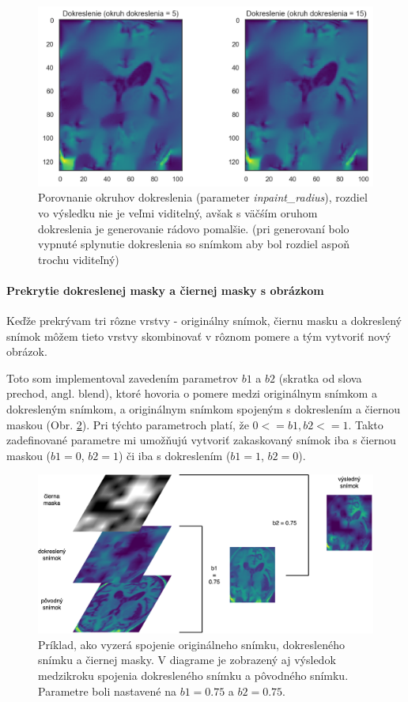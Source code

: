 \begin{figure}[h!]
    \centering
    \includegraphics[width=13cm]{assets/images/inpaint_radius.png}
    \caption{Porovnanie okruhov dokreslenia (parameter \textit{inpaint\_radius}), rozdiel vo výsledku nie je veľmi viditelný, avšak s väčśím oruhom dokreslenia je generovanie rádovo pomalšie. (pri generovaní bolo vypnuté splynutie dokreslenia so snímkom aby bol rozdiel aspoň trochu viditeľný)}
    \label{fig:inpaint_radius}
\end{figure}

\paragraph{Prekrytie dokreslenej masky a čiernej masky s obrázkom}

Keďže prekrývam tri rôzne vrstvy - originálny snímok, čiernu masku a dokreslený snímok môžem tieto vrstvy skombinovať v rôznom pomere a tým vytvoriť nový obrázok.

Toto som implementoval zavedením parametrov $b1$ a $b2$ (skratka od slova prechod, angl. blend), ktoré hovoria o pomere medzi originálnym snímkom a dokresleným snímkom, a originálnym snímkom spojeným s dokreslením a čiernou maskou (Obr. \ref{fig:risei_layers}). Pri týchto parametroch platí, že $0 <= b1, b2 <= 1$. Takto zadefinované parametre mi umožňujú vytvoriť zakaskovaný snímok iba s čiernou maskou ($b1 = 0$, $b2 = 1$) či iba s dokreslením ($b1 = 1$, $b2 = 0$).

\begin{figure}[h!]
    \centering
    \includegraphics[width=13cm]{assets/images/risei_layers.png}
    \caption{Príklad, ako vyzerá spojenie originálneho snímku, dokresleného snímku a čiernej masky. V diagrame je zobrazený aj výsledok medzikroku spojenia dokresleného snímku a pôvodného snímku. Parametre boli nastavené na $b1 = 0.75$ a $b2 = 0.75$.}
    \label{fig:risei_layers}
\end{figure}

